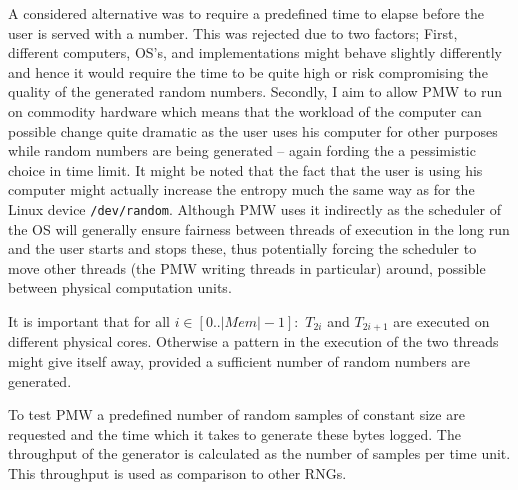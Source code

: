 A considered alternative was to require a predefined time to elapse before the user is served with a number.
This was rejected due to two factors;
First, different computers, OS's, and implementations might behave slightly differently and hence it would require the time to be quite high or risk compromising the quality of the generated random numbers.
Secondly, I aim to allow PMW to run on commodity hardware which means that the workload of the computer can possible change quite dramatic as the user uses his computer for other purposes while random numbers are being generated -- again fording the a pessimistic choice in time limit.
It might be noted that the fact that the user is using his computer might actually increase the entropy much the same way as for the Linux device \texttt{/dev/random}.
Although PMW uses it indirectly as the scheduler of the OS will generally ensure fairness between threads of execution in the long run and the user starts and stops these, thus potentially forcing the scheduler to move other threads (the PMW writing threads in particular) around, possible between physical computation units.

It is important that for all $i\in\left[0..\left|Mem\right|-1\right]:$ $T_{2i}$ and $T_{2i+1}$ are executed on different physical cores.
Otherwise a pattern in the execution of the two threads might give itself away, provided a sufficient number of random numbers are generated.

To test PMW a predefined number of random samples of constant size are requested and the time which it takes to generate these bytes logged.
The throughput of the generator is calculated as the number of samples per time unit.
This throughput is used as comparison to other RNGs.
